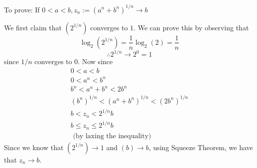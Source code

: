 \documentclass[boxes, qed]{homework}
\begin{document}
\newenvironment{amatrix}[1]{%
  \left[\begin{array}{@{}*{#1}{c}|c@{}}
}{%
  \end{array}\right]
}

\newenvironment{augmatrix}[1]{%
  \left[\begin{array}{#1}
}{%
  \end{array}\right]
}
\begin{problem}To prove: If $0<a<b, z_n := (a^n+b^n)^{1/n} \rightarrow b$
\end{problem}
\begin{solution}We first claim that $(2^{1/n})$ converges to $1$.
  We can prove this by observing that
  $$\log_{2}(2^{1/n}) = \frac{1}{n}\log_{2}(2) = \frac{1}{n}$$
  $$\therefore 2^{1/n} \rightarrow 2^0 = 1$$
  since $1/n$ converges to $0$.
  Now since
  \begin{align*}
    0 < a < b\\
    0 < a^n < b^n\\
    b^n < a^n+b^n < 2b^n\\
    (b^n)^{1/n} < (a^n+b^n)^{1/n} < (2b^n)^{1/n}\\
    b < z_n < 2^{1/n}b\\
    b \le z_n \le 2^{1/n}b\\
    \text{ (by laxing the inequality)}
  \end{align*}
  Since we know that $(2^{1/n}) \rightarrow 1$ 
  and $(b) \rightarrow b$, using Squeeze Theorem,
  we have that $z_n \rightarrow b$.
\end{solution}
\end{document}
